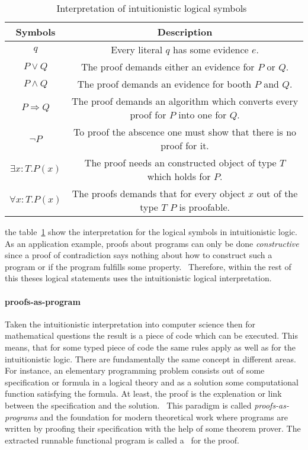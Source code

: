 \begin{table}[h]
  \centering
  \begin{tabular}{c|c}
    Symbols &  Description\\\hline
    $q$ & Every literal $q$ has some evidence $e$.\\
    $P\vee Q$ & The proof demands either an evidence for $P$ or $Q$.\\
    $P\wedge Q$ & The proof demands an evidence for booth $P$ and $Q$.\\
    $P\Rightarrow Q$ & The proof demands an algorithm which converts every proof for $P$
             into one for $Q$.\\
    $\neg P$ & To proof the abscence one must show that there is no proof for it.\\
    $\exists x:T.P(x)$ & The proof needs an constructed object of type $T$ which holds for $P$.\\
    $\forall x:T.P(x)$ & The proofs demands that for every object $x$ out of the type $T$
                   $P$ is proofable.
  \end{tabular}
  \caption{Interpretation of intuitionistic logical symbols~\cite{sep-mathematics-constructive}}
  \label{tab:intsymbols}
\end{table}

the table~\ref{tab:intsymbols} show the interpretation for the logical
symbols in intuitionistic logic. As an application example, proofs about
programs can only be done \textit{constructive} since a proof of contradiction
says nothing about how to construct such a program or if the program
fulfills some property.~\cite{kreitz1994automatisierte}
Therefore, within the rest of this theses logical
statements uses the intuitionistic logical interpretation. 

\paragraph{proofs-as-program}
Taken the intuitionistic interpretation into computer science then for
mathematical questions the result is a piece of code which can be
executed. This means, that for some typed piece of code the same
rules apply as well as for the intuitionistic logic. There are
fundamentally the same concept in different areas.
For instance, an elementary programming problem consists out of
some specification or formula in a logical theory and as a solution
some computational function satisfying the formula. At least, the
proof is the explenation or link between the specification and the
solution.~\cite{bates1985proofs}
This paradigm is called \textit{proofs-as-programs} and the foundation
for modern theoretical work where programs are written by proofing their
specification with the help of some theorem prover. The extracted runnable
functional program is called a~\cite{realizer} for the proof. 

